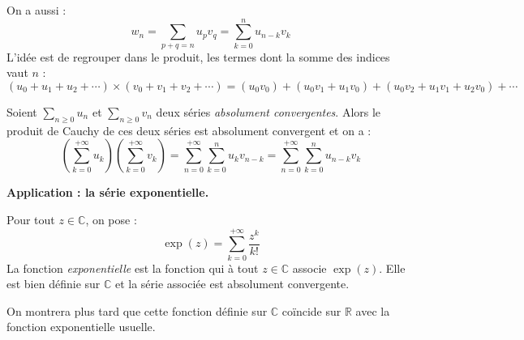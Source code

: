\documentclass[french,11pt,twoside]{VcCours}
\newcommand{\Sum}[2]{\ensuremath{\textstyle{\sum\limits_{#1}^{#2}}}}
\begin{document}
\begin{rem} On a aussi :
$$ w_n = \sum_{p+q=n} u_p v_q =  \sum_{k=0}^n u_{n-k} v_{k}$$
L'idée est de regrouper dans le produit, les termes dont la somme des indices vaut $n$ :
$$ (u_0 + u_1 + u_2 + \cdots) \times (v_0 + v_1 + v_2 + \cdots) = (u_0 v_0) + (u_0 v_1 + u_1 v_0) + (u_0 v_2 + u _1 v_1 + u_2 v_0) + \cdots$$
\end{rem}

\medskip

\begin{thm}[admis]
Soient $\Sum{n \geq 0}{} u_n$ et $\Sum{n \geq 0}{} v_n$ deux séries \textit{absolument convergentes}. Alors le produit de Cauchy de ces deux séries est absolument convergent et on a :
$$ \left( \sum_{k=0}^{+ \infty} u_k \right)\left( \sum_{k=0}^{+ \infty} v_k \right) =  \sum_{n=0}^{+ \infty} \sum_{k=0}^n u_k v_{n-k} = \sum_{n=0}^{+ \infty} \sum_{k=0}^n u_{n-k} v_{k}$$
\end{thm}

\textbf{Application : la série exponentielle.}

\begin{defip} Pour tout $z \in \mathbb{C}$, on pose :
$$ \exp(z) = \sum_{k=0}^{+\infty} \frac{z^k}{k!} $$
La fonction \textit{exponentielle} est la fonction qui à tout $z \in \mathbb{C}$ associe $\exp(z)$. Elle est bien définie sur $\mathbb{C}$ et la série associée est absolument convergente.
\end{defip}

\begin{preuve} 

\vspace{6.5cm}
%
%
%
\end{preuve}

\begin{rem} On montrera plus tard que cette fonction définie sur $\mathbb{C}$ coïncide sur $\mathbb{R}$ avec la fonction exponentielle usuelle.
\end{rem}
\end{document}
